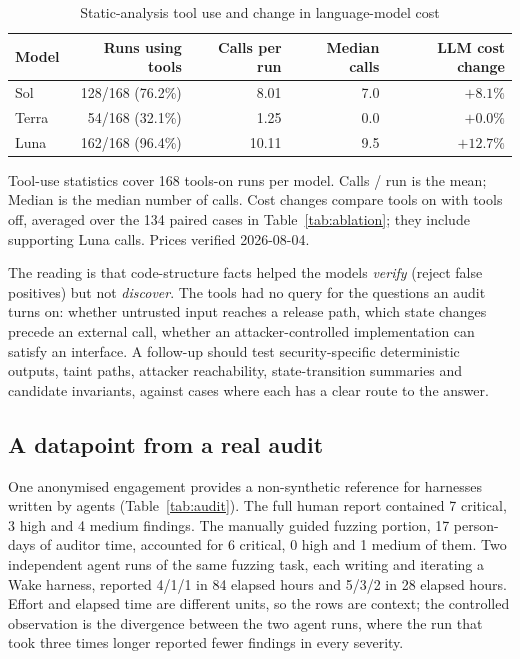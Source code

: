 \documentclass[11pt,a4paper]{article}
\newcommand{\wake}{Wake}
\newcommand{\tablenote}[1]{\par\smallskip\begin{minipage}{\linewidth}\footnotesize\raggedright #1\end{minipage}}
\begin{document}
\begin{table}[t]
\centering\small
\caption{Static-analysis tool use and change in language-model cost}
\label{tab:cost}
\begin{tabular}{@{}lrrrr@{}}
\toprule
Model & Runs using tools & Calls per run & Median calls & LLM cost change \\
\midrule
Sol   & 128/168 (76.2\%) & 8.01  & 7.0 & $+8.1\%$ \\
Terra & 54/168 (32.1\%)  & 1.25  & 0.0 & $+0.0\%$ \\
Luna  & 162/168 (96.4\%) & 10.11 & 9.5 & $+12.7\%$ \\
\bottomrule
\end{tabular}
\tablenote{Tool-use statistics cover 168 tools-on runs per model. Calls / run is the mean; Median is the median number of calls. Cost changes compare tools on with tools off, averaged over the 134 paired cases in Table~\ref{tab:ablation}; they include supporting Luna calls. Prices verified 2026-08-04.}
\end{table}

The reading is that code-structure facts helped the models \emph{verify} (reject false positives) but not \emph{discover}. The tools had no query for the questions an audit turns on: whether untrusted input reaches a release path, which state changes precede an external call, whether an attacker-controlled implementation can satisfy an interface. A follow-up should test security-specific deterministic outputs, taint paths, attacker reachability, state-transition summaries and candidate invariants, against cases where each has a clear route to the answer.

\subsection{A datapoint from a real audit}
\label{sec:audit}

One anonymised engagement provides a non-synthetic reference for harnesses written by agents (Table~\ref{tab:audit}). The full human report contained 7 critical, 3 high and 4 medium findings. The manually guided fuzzing portion, 17 person-days of auditor time, accounted for 6 critical, 0 high and 1 medium of them. Two independent agent runs of the same fuzzing task, each writing and iterating a \wake{} harness, reported 4/1/1 in 84 elapsed hours and 5/3/2 in 28 elapsed hours. Effort and elapsed time are different units, so the rows are context; the controlled observation is the divergence between the two agent runs, where the run that took three times longer reported fewer findings in every severity.
\end{document}
